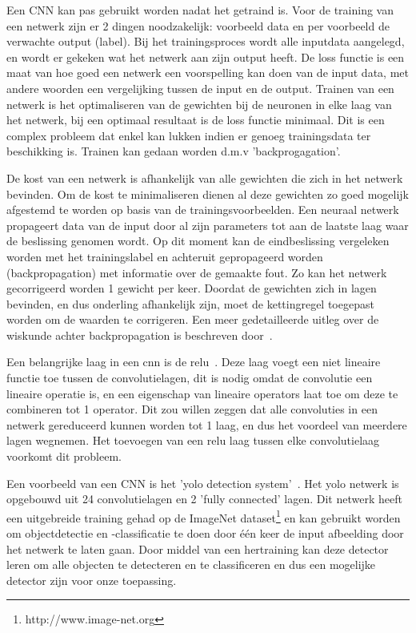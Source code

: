            Een CNN kan pas gebruikt worden nadat het getraind is. Voor de training van een netwerk zijn er 2 dingen noodzakelijk: voorbeeld data en per voorbeeld de verwachte output (label).
            Bij het trainingsproces wordt alle inputdata aangelegd, en wordt er gekeken wat het netwerk aan zijn output heeft.
            De loss functie is een maat van hoe goed een netwerk een voorspelling kan doen van de input data, met andere woorden een vergelijking tussen de input en de output.
            Trainen van een netwerk is het optimaliseren van de gewichten bij de neuronen in elke laag van het netwerk, bij een optimaal resultaat is de loss functie minimaal.
            Dit is een complex probleem dat enkel kan lukken indien er genoeg trainingsdata ter beschikking is.
            Trainen kan gedaan worden d.m.v 'backprogagation'\cite{lecun2012efficient}.

            De kost van een netwerk is afhankelijk van alle gewichten die zich in het netwerk bevinden.
            Om de kost te minimaliseren dienen al deze gewichten zo goed mogelijk afgestemd te worden op basis van de trainingsvoorbeelden.
            Een neuraal netwerk propageert data van de input door al zijn parameters tot aan de laatste laag waar de beslissing genomen wordt.
            Op dit moment kan de eindbeslissing vergeleken worden met het trainingslabel en achteruit gepropageerd worden (backpropagation) met informatie over de gemaakte fout.
            Zo kan het netwerk gecorrigeerd worden 1 gewicht per keer.
            Doordat de gewichten zich in lagen bevinden, en dus onderling afhankelijk zijn, moet de kettingregel toegepast worden om de waarden te corrigeren.
            Een meer gedetailleerde uitleg over de wiskunde achter backpropagation is beschreven door~\cite{nielsenneural}.

            Een belangrijke laag in een \gls{cnn} is de \gls{relu}~\cite{NIPS2012_4824}.
            Deze laag voegt een niet lineaire functie toe tussen de convolutielagen, dit is nodig omdat de convolutie een lineaire operatie is, en een eigenschap van lineaire operators laat toe om deze te combineren tot 1 operator.
            Dit zou willen zeggen dat alle convoluties in een netwerk gereduceerd kunnen worden tot 1 laag, en dus het voordeel van meerdere lagen wegnemen.
            Het toevoegen van een \gls{relu} laag tussen elke convolutielaag voorkomt dit probleem.

            Een voorbeeld van een CNN is het '\gls{yolo} detection system'~\cite{Redmon_2016}. Het \gls{yolo} netwerk is opgebouwd uit 24 convolutielagen en 2 'fully connected' lagen.
            Dit netwerk heeft een uitgebreide training gehad op de ImageNet dataset\footnote{http://www.image-net.org} en kan gebruikt worden om objectdetectie en -classificatie te doen door \'{e}\'{e}n keer de input afbeelding door het netwerk te laten gaan.
            Door middel van een hertraining kan deze detector leren om alle objecten te detecteren en te classificeren en dus een mogelijke detector zijn voor onze toepassing.

